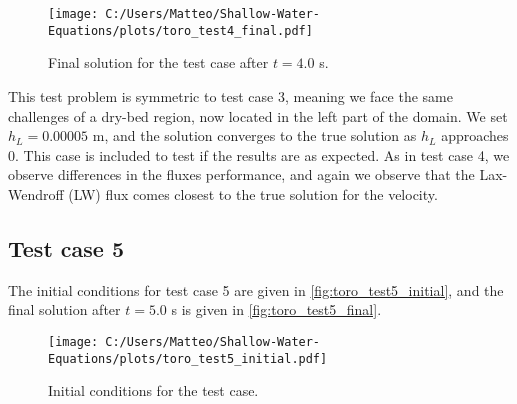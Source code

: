 \begin{figure}[H]
    \centering
    \texttt{[image: C:/Users/Matteo/Shallow-Water-Equations/plots/toro\_test4\_final.pdf]}
    \caption{Final solution for the test case after $t = 4.0$ s.}\label{fig:toro_test4_final}
\end{figure}
This test problem is symmetric to test case 3, meaning we face the same challenges of a dry-bed region, now located in the left part of the domain.
We set $h_L = 0.00005$ m, and the solution converges to the true solution as $h_L$ approaches 0.
This case is included to test if the results are as expected.
As in test case 4, we observe differences in the fluxes performance, and again we observe that the Lax-Wendroff (LW) flux comes closest to the true solution for the velocity.

\newpage
\subsection*{Test case 5}
The initial conditions for test case 5 are given in \autoref{fig:toro_test5_initial}, and the final solution after $t=5.0$ s is given in \autoref{fig:toro_test5_final}.
\begin{figure}[H]
    \centering
    \texttt{[image: C:/Users/Matteo/Shallow-Water-Equations/plots/toro\_test5\_initial.pdf]}
    \caption{Initial conditions for the test case.}\label{fig:toro_test5_initial}
\end{figure}

